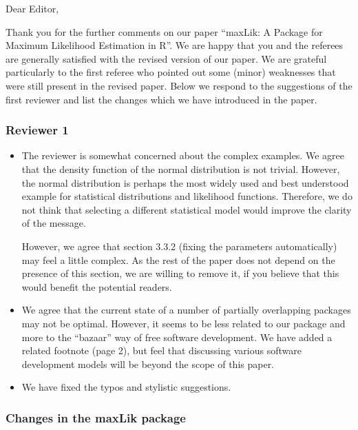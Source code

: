 \documentclass[12pt,parskip=half]{scrartcl}
\begin{document}
\pagestyle{empty}
\enlargethispage{10mm}

Dear Editor,

\bigskip

Thank you for the further comments on our paper ``maxLik: A
Package for Maximum Likelihood Estimation in R''.
We are happy that you and the referees are generally satisfied
with the revised version of our paper.
We are grateful particularly to the first referee
who pointed out some (minor) weaknesses
that were still present in the revised paper.
Below we respond to the suggestions of the first reviewer
and list the changes which we have introduced in the paper.


\subsubsection*{Reviewer 1}

\begin{itemize}
\item The reviewer is somewhat concerned about the complex examples.
  We agree that the density function of the normal distribution is not trivial.
  However, the normal distribution is perhaps the most widely used and
  best understood example for statistical distributions and likelihood
  functions.
  Therefore, we do not think that selecting a different statistical model
  would improve the clarity of the message.

  However, we agree that section 3.3.2 (fixing the parameters
  automatically) may feel a little complex.  As the rest of the paper
  does not depend on the presence of this section, we are willing to
  remove it, if you believe that this would benefit the potential readers.
\item We agree that the current state of a number of partially
  overlapping packages may not be optimal.  However, it seems to be
  less related to our package and more to the ``bazaar'' way of free
  software development.  We have added a related footnote (page 2),
  but feel that discussing various software development models will be
  beyond the scope of this paper.
\item We have fixed the typos and stylistic suggestions.
\end{itemize}

\subsubsection*{Changes in the maxLik package}
\end{document}
